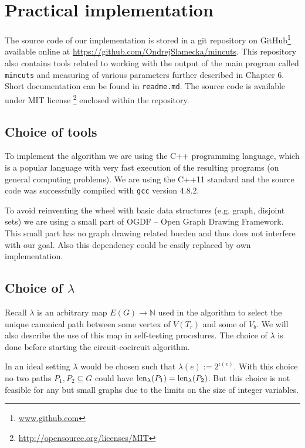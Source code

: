 \chapter{Practical implementation}
\label{ch:practical_impl}

The source code of our implementation is stored in a git repository on GitHub\footnote{\url{www.github.com}} available online at \url{https://github.com/OndrejSlamecka/mincuts}. This repository also contains tools related to working with the output of the main program called \lstinline|mincuts| and measuring of various parameters further described in Chapter 6. Short documentation can be found in \lstinline|readme.md|. The source code is available under MIT license \footnote{\url{http://opensource.org/licenses/MIT}} enclosed within the repository.

\section{Choice of tools}

To implement the algorithm we are using the C++ programming language, which is a popular language with very fast execution of the resulting programs (on general computing problems). We are using the C++11 standard and the source code was successfully compiled with \lstinline|gcc| version 4.8.2.

To avoid reinventing the wheel with basic data structures (e.g. graph, disjoint sets) we are using a small part of OGDF -- Open Graph Drawing Framework. This small part has no graph drawing related burden and thus does not interfere with our goal. Also this dependency could be easily replaced by own implementation.

\section{Choice of $\lambda$}
\label{sec:choice_of_lambda}

Recall $\lambda$ is an arbitrary map $E(G) \rightarrow \mathbb{N}$ used in the algorithm to select the unique canonical path between some vertex of $V(T_r)$ and some of $V_b$. We will also describe the use of this map in self-testing procedures. The choice of $\lambda$ is done before starting the circuit-\linebreak{}cocircuit algorithm.

In an ideal setting $\lambda$ would be chosen such that $\lambda(e) := 2^{\iota(e)}$. With this choice no two paths $P_1, P_2 \subseteq G$ could have $\operatorname{len}_{\lambda}(P_1) = \operatorname{len}_{\lambda}(P_2)$. But this choice is not feasible for any but small graphs due to the limits on the size of integer variables.

